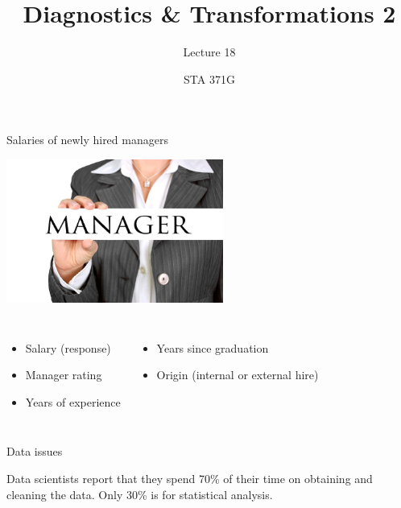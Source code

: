 \documentclass{beamer}\usepackage[]{graphicx}\usepackage[]{color}
\title{Diagnostics \& Transformations 2}
\subtitle{Lecture 18}
\author{STA 371G}
\begin{document}
  
  

  \frame{\maketitle}



  \begin{darkframes}
    \begin{frame}{Salaries of newly hired managers}
      \begin{center}
        \includegraphics[width=2.8in]{manager} \\
      \end{center} \pause

      \begin{columns}[onlytextwidth]
          \begin{itemize}
            \item Salary (response)
            \item Manager rating
            \item Years of experience
          \end{itemize}
          \begin{itemize}
            \item Years since graduation
            \item Origin (internal or external hire)
          \end{itemize}
      \end{columns}
    \end{frame}

\begin{frame}[fragile]{Data issues}
      \begin{center}
        Data scientists report that they spend \alert{70\% of their time on obtaining and cleaning the data}. Only 30\% is for statistical analysis.\bigskip \pause


\end{center}
\end{frame}
\end{darkframes}
\end{document}
